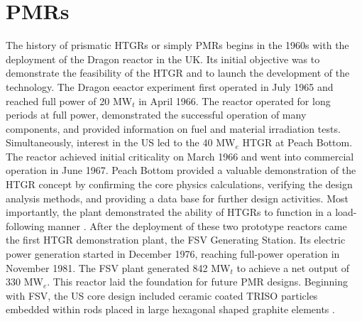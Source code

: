 \documentclass[11pt,letterpaper]{article}
\begin{document}

\section{\glspl{PMR}}

The history of prismatic \glspl{HTGR} or simply \glspl{PMR} begins in the 1960s with the deployment of the Dragon reactor in the \gls{UK}.
Its initial objective was to demonstrate the feasibility of the \gls{HTGR} and to launch the development of the technology.
The Dragon eeactor experiment first operated in July 1965 and reached full power of 20 MW$_t$ in April 1966.
The reactor operated for long periods at full power, demonstrated the successful operation of many components, and provided information on fuel and material irradiation tests.
Simultaneously, interest in the \gls{US} led to the 40 MW$_e$ \gls{HTGR} at Peach Bottom.
The reactor achieved initial criticality on March 1966 and went into commercial operation in June 1967.
Peach Bottom provided a valuable demonstration of the \gls{HTGR} concept by confirming the core physics calculations, verifying the design analysis methods, and providing a data base for further design activities.
Most importantly, the plant demonstrated the ability of \glspl{HTGR} to function in a load-following manner \cite{brey_development_2001}.
After the deployment of these two prototype reactors came the first \gls{HTGR} demonstration plant, the \gls{FSV} Generating Station.
Its electric power generation started in December 1976, reaching full-power operation in November 1981.
The \gls{FSV} plant generated 842 MW$_t$ to achieve a net output of 330 MW$_e$.
This reactor laid the foundation for future \gls{PMR} designs.
Beginning with \gls{FSV}, the \gls{US} core design included ceramic coated \gls{TRISO} particles embedded within rods placed in large hexagonal shaped graphite elements \cite{brey_development_2001}.
\end{document}
